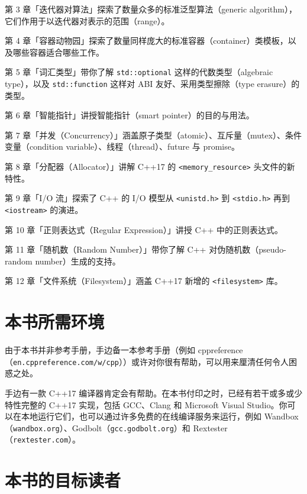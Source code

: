 第 3 章「迭代器对算法」探索了数量众多的标准泛型算法（generic algorithm），它们作用于以迭代器对表示的范围（range）。

第 4 章「容器动物园」探索了数量同样庞大的标准容器（container）类模板，以及哪些容器适合哪些工作。

第 5 章「词汇类型」带你了解 \texttt{std::\allowbreak{}optional} 这样的代数类型（algebraic type），以及 \texttt{std::\allowbreak{}function} 这样对 ABI 友好、采用类型擦除（type erasure）的类型。

第 6 章「智能指针」讲授智能指针（smart pointer）的目的与用法。

第 7 章「并发（Concurrency）」涵盖原子类型（atomic）、互斥量（mutex）、条件变量（condition variable）、线程（thread）、future 与 promise。

第 8 章「分配器（Allocator）」讲解 C++17 的 \texttt{<memory\_\allowbreak{}resource>\allowbreak{}} 头文件的新特性。

第 9 章「I/O 流」探索了 C++ 的 I/O 模型从 \texttt{<unistd.\allowbreak{}h>\allowbreak{}} 到 \texttt{<stdio.\allowbreak{}h>\allowbreak{}} 再到 \texttt{<iostream>\allowbreak{}} 的演进。

第 10 章「正则表达式（Regular Expression）」讲授 C++ 中的正则表达式。

第 11 章「随机数（Random Number）」带你了解 C++ 对伪随机数（pseudo-random number）生成的支持。

第 12 章「文件系统（Filesystem）」涵盖 C++17 新增的 \texttt{<filesystem>\allowbreak{}} 库。

\section{本书所需环境}

由于本书并非参考手册，手边备一本参考手册（例如 cppreference（\texttt{en.\allowbreak{}cppreference.\allowbreak{}com/\allowbreak{}w/\allowbreak{}cpp}））或许对你很有帮助，可以用来厘清任何令人困惑之处。

手边有一款 C++17 编译器肯定会有帮助。在本书付印之时，已经有若干或多或少特性完整的 C++17 实现，包括 GCC、Clang 和 Microsoft Visual Studio。你可以在本地运行它们，也可以通过许多免费的在线编译服务来运行，例如 Wandbox（\texttt{wandbox.\allowbreak{}org}）、Godbolt（\texttt{gcc.\allowbreak{}godbolt.\allowbreak{}org}）和 Rextester（\texttt{rextester.\allowbreak{}com}）。

\section{本书的目标读者}

